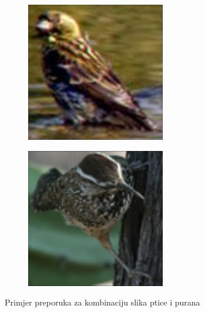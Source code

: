 \documentclass[times, utf8, proizvoljni, numeric]{fer}
\begin{document}
\begin{figure}[ht!]
\begin{subfigure}[t]{0.19\textwidth}
	\end{subfigure}
	\begin{subfigure}[t]{0.19\textwidth}
		\includegraphics[width=\textwidth,height=\textwidth]{./imgs/demo-preporucitelja-po-sadrzaju/tijek-rada/id@3995.png}
	\end{subfigure}
	\begin{subfigure}[t]{0.19\textwidth}
		\includegraphics[width=\textwidth,height=\textwidth]{./imgs/demo-preporucitelja-po-sadrzaju/tijek-rada/id@182.png}
	\end{subfigure}
	\caption{Primjer preporuka za kombinaciju slika ptice i purana}
	\label{fg:demo_bird_v3}
		
\end{figure}
\end{document}
